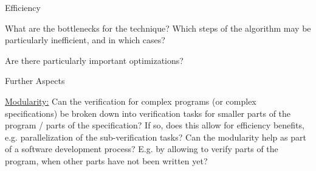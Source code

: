 \documentclass[a4paper]{article}
\begin{document}
\begin{minipage}[t]{0.16\linewidth}
\begin{betterlist}
\begin{betterlist}
		\end{betterlist}
		\item \alert{Efficiency}
		\begin{betterlist}
			\item What are the bottlenecks for the technique? Which steps of the algorithm may be particularly inefficient, and in which cases?

			\item Are there particularly important optimizations?

		\end{betterlist}
		\item \alert{Further Aspects}
		\begin{betterlist}
			\item \underline{Modularity:} Can the verification for complex programs (or complex specifications) be broken down into verification tasks for smaller parts of the program / parts of the specification? If so, does this allow for efficiency benefits, e.g. parallelization of the sub-verification tasks? Can the modularity help as part of a software development process? E.g. by allowing to verify parts of the program, when other parts have not been written yet?

\end{betterlist}
\end{betterlist}
\end{minipage}
\end{document}
